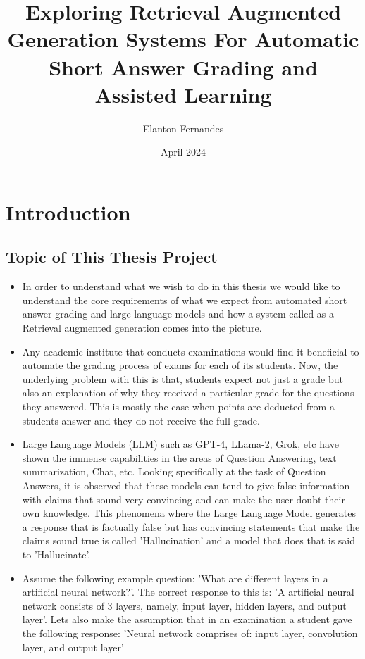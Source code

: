 \documentclass[thesis]{mas_proposal}
\title{Exploring Retrieval Augmented Generation Systems For Automatic Short Answer Grading and Assisted Learning}
\author{Elanton Fernandes}
\date{April 2024}
\begin{document}
\maketitle

\pagestyle{plain}

\section{Introduction}

\subsection{Topic of This Thesis Project}
\begin{itemize}
    \item In order to understand what we wish to do in this thesis we would like to understand the core requirements of what we expect from automated short answer grading and large language models and how a system called as a Retrieval augmented generation comes into the picture.
    \item Any academic institute that conducts examinations would find it beneficial to automate the grading process of exams for each of its students. Now, the underlying problem with this is that, students expect not just a grade but also an explanation of why they received a particular grade for the questions they answered. This is mostly the case when points are deducted from a students answer and they do not receive the full grade.
    \item Large Language Models (LLM) such as GPT-4,  LLama-2, Grok, etc have shown the immense capabilities in the areas of Question Answering, text summarization, Chat, etc. Looking specifically at the task of Question Answers, it is observed that these models can tend to give false information with claims that sound very convincing and can make the user doubt their own knowledge. This phenomena where the Large Language Model generates a response that is factually false but has convincing statements that make the claims sound true is called 'Hallucination' and a model that does that is said to 'Hallucinate'.
    \item Assume the following example question: 'What are different layers in a artificial neural network?'. The correct response to this is: 'A artificial neural network consists of 3 layers, namely, input layer, hidden layers, and output layer'. Lets also make the assumption that in an examination a student gave the following response: 'Neural network comprises of: input layer, convolution layer, and output layer'

\end{itemize}
\end{document}
